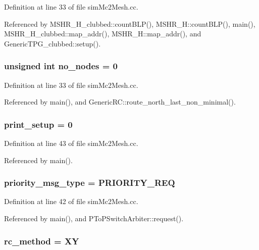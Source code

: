 Definition at line 33 of file simMc2Mesh.cc.

Referenced by MSHR\_\-H\_\-clubbed::countBLP(), MSHR\_\-H::countBLP(), main(), MSHR\_\-H\_\-clubbed::map\_\-addr(), MSHR\_\-H::map\_\-addr(), and GenericTPG\_\-clubbed::setup().
\subsubsection[{no\_\-nodes}]{\setlength{\rightskip}{0pt plus 5cm}unsigned int {\bf no\_\-nodes} = 0}\label{simMc2Mesh_8cc_e6ac8ea6f14ad67a94df03963a6613d1}




Definition at line 33 of file simMc2Mesh.cc.

Referenced by main(), and GenericRC::route\_\-north\_\-last\_\-non\_\-minimal().
\subsubsection[{print\_\-setup}]{ {\bf print\_\-setup} = 0}\label{simMc2Mesh_8cc_7452dad8b46b310822227835f5344cd6}




Definition at line 43 of file simMc2Mesh.cc.

Referenced by main().
\subsubsection[{priority\_\-msg\_\-type}]{ {\bf priority\_\-msg\_\-type} = PRIORITY\_\-REQ}\label{simMc2Mesh_8cc_d5a703dac7fa374903a9f220ede1b2d6}




Definition at line 42 of file simMc2Mesh.cc.

Referenced by main(), and PToPSwitchArbiter::request().
\subsubsection[{rc\_\-method}]{ {\bf rc\_\-method} = XY}\label{simMc2Mesh_8cc_05eafa33205e9c1fe68de799a351f775}




